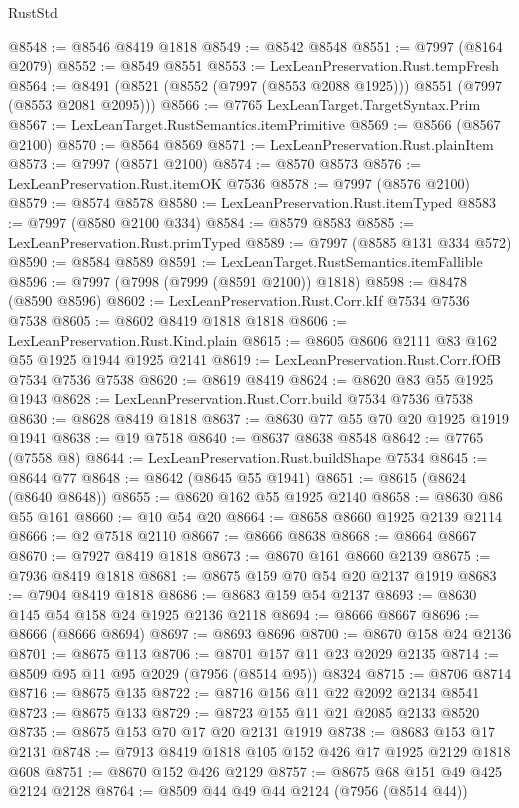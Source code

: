 \begin{lexlean}{RustStd}
\begin{coremodule}
{\begin{coremodule}
{{{{{{{{{{{{{{{{{{{{{{{{{{{{{{{{{{{{{{{{{{{@8548 := @8546 @8419 @1818
@8549 := @8542 @8548
@8551 := @7997 (@8164 @2079)
@8552 := @8549 @8551
@8553 := LexLeanPreservation.Rust.tempFresh
@8564 := @8491 (@8521 (@8552 (@7997 (@8553 @2088 @1925))) @8551 (@7997 (@8553 @2081 @2095)))
@8566 := @7765 LexLeanTarget.TargetSyntax.Prim
@8567 := LexLeanTarget.RustSemantics.itemPrimitive
@8569 := @8566 (@8567 @2100)
@8570 := @8564 @8569
@8571 := LexLeanPreservation.Rust.plainItem
@8573 := @7997 (@8571 @2100)
@8574 := @8570 @8573
@8576 := LexLeanPreservation.Rust.itemOK @7536
@8578 := @7997 (@8576 @2100)
@8579 := @8574 @8578
@8580 := LexLeanPreservation.Rust.itemTyped
@8583 := @7997 (@8580 @2100 @334)
@8584 := @8579 @8583
@8585 := LexLeanPreservation.Rust.primTyped
@8589 := @7997 (@8585 @131 @334 @572)
@8590 := @8584 @8589
@8591 := LexLeanTarget.RustSemantics.itemFallible
@8596 := @7997 (@7998 (@7999 (@8591 @2100)) @1818)
@8598 := @8478 (@8590 @8596)
@8602 := LexLeanPreservation.Rust.Corr.kIf @7534 @7536 @7538
@8605 := @8602 @8419 @1818 @1818
@8606 := LexLeanPreservation.Rust.Kind.plain
@8615 := @8605 @8606 @2111 @83 @162 @55 @1925 @1944 @1925 @2141
@8619 := LexLeanPreservation.Rust.Corr.fOfB @7534 @7536 @7538
@8620 := @8619 @8419
@8624 := @8620 @83 @55 @1925 @1943
@8628 := LexLeanPreservation.Rust.Corr.build @7534 @7536 @7538
@8630 := @8628 @8419 @1818
@8637 := @8630 @77 @55 @70 @20 @1925 @1919 @1941
@8638 := @19 @7518
@8640 := @8637 @8638 @8548
@8642 := @7765 (@7558 @8)
@8644 := LexLeanPreservation.Rust.buildShape @7534
@8645 := @8644 @77
@8648 := @8642 (@8645 @55 @1941)
@8651 := @8615 (@8624 (@8640 @8648))
@8655 := @8620 @162 @55 @1925 @2140
@8658 := @8630 @86 @55 @161
@8660 := @10 @54 @20
@8664 := @8658 @8660 @1925 @2139 @2114
@8666 := @2 @7518 @2110
@8667 := @8666 @8638
@8668 := @8664 @8667
@8670 := @7927 @8419 @1818
@8673 := @8670 @161 @8660 @2139
@8675 := @7936 @8419 @1818
@8681 := @8675 @159 @70 @54 @20 @2137 @1919
@8683 := @7904 @8419 @1818
@8686 := @8683 @159 @54 @2137
@8693 := @8630 @145 @54 @158 @24 @1925 @2136 @2118
@8694 := @8666 @8667
@8696 := @8666 (@8666 @8694)
@8697 := @8693 @8696
@8700 := @8670 @158 @24 @2136
@8701 := @8675 @113
@8706 := @8701 @157 @11 @23 @2029 @2135
@8714 := @8509 @95 @11 @95 @2029 (@7956 (@8514 @95)) @8324
@8715 := @8706 @8714
@8716 := @8675 @135
@8722 := @8716 @156 @11 @22 @2092 @2134 @8541
@8723 := @8675 @133
@8729 := @8723 @155 @11 @21 @2085 @2133 @8520
@8735 := @8675 @153 @70 @17 @20 @2131 @1919
@8738 := @8683 @153 @17 @2131
@8748 := @7913 @8419 @1818 @105 @152 @426 @17 @1925 @2129 @1818 @608
@8751 := @8670 @152 @426 @2129
@8757 := @8675 @68 @151 @49 @425 @2124 @2128
@8764 := @8509 @44 @49 @44 @2124 (@7956 (@8514 @44))
}}}}}}}}}}}}}}}}}}}}}}}}}}}}}}}}}}}}}}}}}}}
\end{coremodule}}
\end{coremodule}
\end{lexlean}
